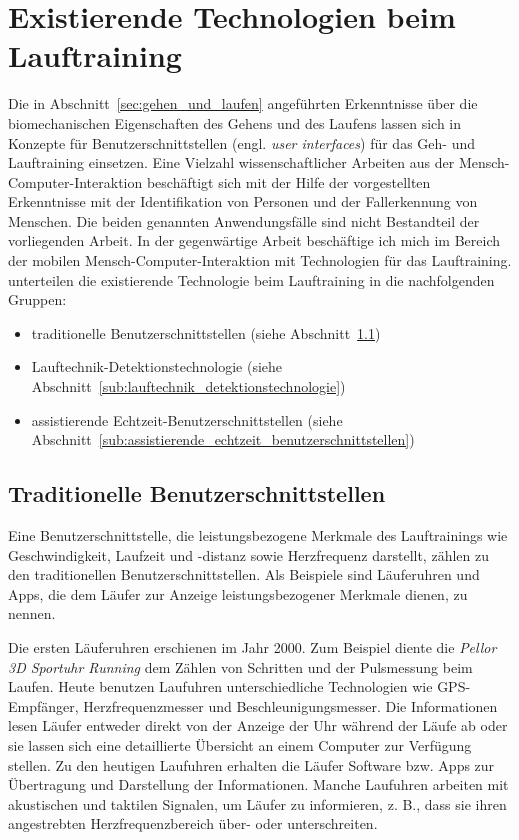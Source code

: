 \section{Existierende Technologien beim Lauftraining}
\label{sec:existierende_technologien_beim_lauftraining}

Die in Abschnitt~\ref{sec:gehen_und_laufen} angeführten Erkenntnisse über die biomechanischen Eigenschaften des Gehens und des Laufens lassen sich in Konzepte für Benutzerschnittstellen (engl. \emph{user interfaces}) für das Geh- und Lauftraining einsetzen. Eine Vielzahl wissenschaftlicher Arbeiten aus der Mensch-Computer-Interaktion beschäftigt sich mit der Hilfe der vorgestellten Erkenntnisse mit der Identifikation von Personen und der Fallerkennung von Menschen. Die beiden genannten Anwendungsfälle sind nicht Bestandteil der vorliegenden Arbeit. In der gegenwärtige Arbeit beschäftige ich mich im Bereich der mobilen Mensch-Computer-Interaktion mit Technologien für das Lauftraining. \citet{Jensen2014} unterteilen die existierende Technologie beim Lauftraining in die nachfolgenden Gruppen:

\begin{itemize}
\item traditionelle Benutzerschnittstellen (siehe Abschnitt~\ref{sub:traditionelle_benutzerschnittstellen})
\item Lauftechnik-Detektionstechnologie (siehe Abschnitt~\ref{sub:lauftechnik_detektionstechnologie})
\item assistierende Echtzeit-Benutzerschnittstellen (siehe Abschnitt~\ref{sub:assistierende_echtzeit_benutzerschnittstellen})
\end{itemize}

\subsection{Traditionelle Benutzerschnittstellen}
\label{sub:traditionelle_benutzerschnittstellen}

Eine Benutzerschnittstelle, die leistungsbezogene Merkmale des Lauftrainings wie Geschwindigkeit, Laufzeit und -distanz sowie Herzfrequenz darstellt, zählen \citet{Jensen2014} zu den traditionellen Benutzerschnittstellen. Als Beispiele sind Läuferuhren und Apps, die dem Läufer zur Anzeige leistungsbezogener Merkmale dienen, zu nennen.

Die ersten Läuferuhren erschienen im Jahr 2000. Zum Beispiel diente die \emph{Pellor 3D Sportuhr Running} dem Zählen von Schritten und der Pulsmessung beim Laufen. Heute benutzen Laufuhren unterschiedliche Technologien wie \ac{GPS}-Empfänger, Herzfrequenzmesser und Beschleunigungsmesser. Die Informationen lesen Läufer entweder direkt von der Anzeige der Uhr während der Läufe ab oder sie lassen sich eine detaillierte Übersicht an einem Computer zur Verfügung stellen. Zu den heutigen Laufuhren erhalten die Läufer Software bzw. Apps zur Übertragung und Darstellung der Informationen. Manche Laufuhren arbeiten mit akustischen und taktilen Signalen, um Läufer zu informieren, z. B., dass sie ihren angestrebten Herzfrequenzbereich über- oder unterschreiten.

